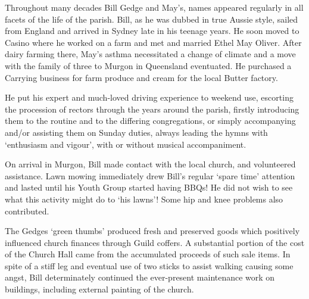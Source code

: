 Throughout many decades Bill Gedge and May's, names appeared regularly in all facets of the life of the parish. Bill, as he was dubbed in true Aussie style, sailed from England and arrived in Sydney late in his teenage years. He soon moved to Casino where he worked on a farm and met and married Ethel May Oliver. After dairy farming there, May's asthma necessitated a change of climate and a move with the family of three to Murgon in Queensland eventuated. He purchased a Carrying business for farm produce and cream for the local Butter factory.



He put his expert and much-loved driving experience to weekend use, escorting the procession of rectors through the years around the parish, firstly introducing them to the routine and to the differing congregations, or simply accompanying and/or assisting them on Sunday duties, always leading the hymns with `enthusiasm and vigour', with or without musical accompaniment.



On arrival in Murgon, Bill made contact with the local church, and volunteered assistance. Lawn mowing immediately drew Bill's regular `spare time' attention and lasted until his Youth Group started having BBQs! He did not wish to see what this activity might do to `his lawns'! Some hip and knee problems also contributed.



The Gedges `green thumbs' produced fresh and preserved goods which positively influenced church finances through Guild coffers. A substantial portion of the cost of the Church Hall came from the accumulated proceeds of such sale items. In spite of a stiff leg and eventual use of two sticks to assist walking causing some angst, Bill determinately continued the ever-present maintenance work on buildings, including external painting of the church.









